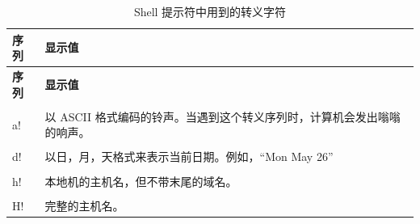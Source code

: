 \documentclass[doctor,openright,twoside]{sjtuthesis}
\newcommand{\passthrough}[1]{#1}
\theoremstyle{plain}
\theoremstyle{definition}
\theoremstyle{remark}
\theoremstyle{ocrenumbox}
\theoremstyle{plain}
\begin{document}
\begin{longtable}[]{@{}ll@{}}
\caption{Shell 提示符中用到的转义字符}\tabularnewline
\toprule
\begin{minipage}[b]{0.22\columnwidth}\raggedright
\textbf{序列}\strut
\end{minipage} & \begin{minipage}[b]{0.72\columnwidth}\raggedright
\textbf{显示值}\strut
\end{minipage}\tabularnewline
\midrule
\endfirsthead
\toprule
\begin{minipage}[b]{0.22\columnwidth}\raggedright
\textbf{序列}\strut
\end{minipage} & \begin{minipage}[b]{0.72\columnwidth}\raggedright
\textbf{显示值}\strut
\end{minipage}\tabularnewline
\midrule
\endhead
\begin{minipage}[t]{0.22\columnwidth}\raggedright
\passthrough{\lstinline!\\a!}\strut
\end{minipage} & \begin{minipage}[t]{0.72\columnwidth}\raggedright
以 ASCII 格式编码的铃声。当遇到这个转义序列时，计算机会发出嗡嗡的响声。\strut
\end{minipage}\tabularnewline
\begin{minipage}[t]{0.22\columnwidth}\raggedright
\passthrough{\lstinline!\\d!}\strut
\end{minipage} & \begin{minipage}[t]{0.72\columnwidth}\raggedright
以日，月，天格式来表示当前日期。例如，``Mon May 26''\strut
\end{minipage}\tabularnewline
\begin{minipage}[t]{0.22\columnwidth}\raggedright
\passthrough{\lstinline!\\h!}\strut
\end{minipage} & \begin{minipage}[t]{0.72\columnwidth}\raggedright
本地机的主机名，但不带末尾的域名。\strut
\end{minipage}\tabularnewline
\begin{minipage}[t]{0.22\columnwidth}\raggedright
\passthrough{\lstinline!\\H!}\strut
\end{minipage} & \begin{minipage}[t]{0.72\columnwidth}\raggedright
完整的主机名。\strut
\end{minipage}\tabularnewline

\end{longtable}
\end{document}
